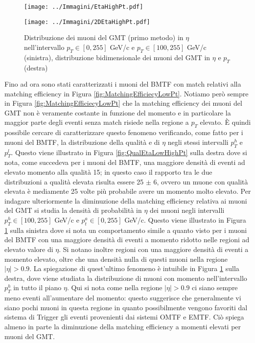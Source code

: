 \begin{figure}[b]
  \centering
  \begin{minipage}[b]{0.47\textwidth}
    \centering
    \texttt{[image: ../Immagini/EtaHighPt.pdf]} 
    \end{minipage}
    \hfill 
    \begin{minipage}[b]{0.51\textwidth}
      \centering
      \texttt{[image: ../Immagini/2DEtaHighPt.pdf]}
    \end{minipage}
    \caption{Distribuzione dei muoni del GMT (primo metodo) in $\eta$  nell'intervallo $p_T \in [0, 255]$ GeV/c e $p_T \in [100, 255]$ GeV/c (sinistra), distribuzione bidimensionale dei muoni del GMT in $\eta$ e $p_T$ (destra)}
  \label{fig:MatchingEfficiecyPt2}
\end{figure}

Fino ad ora sono stati caratterizzati i muoni del BMTF con match relativi alla matching efficiency in Figura \ref{fig:MatchingEfficiecyLowPt}. Notiamo però sempre in Figura \ref{fig:MatchingEfficiecyLowPt} che la matching efficiency dei muoni del GMT non è veramente costante in funzione del momento e in particolare la maggior parte degli eventi senza match risiede nella regione a $p_T$ elevato. È quindi possibile cercare di caratterizzare questo fenomeno verificando, come fatto per i muoni del BMTF, la distribuzione della qualità e di $\eta$ negli stessi intervalli $p_T^h$ e $p_T^l$. Questo viene illustrato in Figura \ref{fig:QualEtaLowHighPt} sulla destra dove si nota, come succedeva per i muoni del BMTF, una maggiore densità di eventi ad elevato momento alla qualità 15; in questo caso il rapporto tra le due distribuzioni a qualità elevata risulta essere 25 $\pm$ 6, ovvero un muone con qualità elevata è mediamente 25 volte più probabile avere un momento molto elevato. \newline
Per indagare ulteriormente la diminuzione della matching efficiency relativa ai muoni del GMT si studia la densità di probabilità in $\eta$ dei muoni negli intervalli $p_T^h \in [100, 255]$ GeV/c e $p_t^a \in [0, 255]$ GeV/c. Questo viene illustrato in Figura \ref{fig:MatchingEfficiecyPt2} sulla sinistra dove si nota un comportamento simile a quanto visto per i muoni del BMTF con una maggiore densità di eventi a momento ridotto nelle regioni ad elevato valore di $\eta$. Si notano inoltre regioni con una maggiore densità di eventi a momento elevato, oltre che una densità nulla di questi muoni nella regione $|\eta| > 0.9$. La spiegazione di quest'ultimo fenomeno è intuibile in Figura \ref{fig:MatchingEfficiecyPt2} sulla destra, dove viene studiata la distribuzione di muoni con momento nell'intervallo $p_T^h$ in tutto il piano $\eta$. Qui si nota come nella regione $|\eta| > 0.9$ ci siano sempre meno eventi all'aumentare del momento: questo suggerisce che generalmente vi siano pochi muoni in questa regione in quanto possibilmente vengono favoriti dal sistema di Trigger gli eventi provenienti dai sistemi OMTF e EMTF. 
Ciò spiega almeno in parte la diminuzione della matching efficiency a momenti elevati per muoni del GMT.


